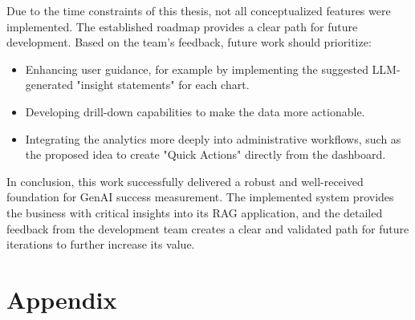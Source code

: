 \documentclass[
	english,
	ruledheaders=section,%
	class=report,%
	thesis={type=bachelor},%
	accentcolor=1b,%
	custommargins=true,%
	marginpar=false,%
	parskip=half-,%
	fontsize=11pt,%
	DIV=14,
]{tudapub}
\begin{document}
Due to the time constraints of this thesis, not all conceptualized features were implemented. The established roadmap provides a clear path for future development. Based on the team's feedback, future work should prioritize:
\begin{itemize}
    \item Enhancing user guidance, for example by implementing the suggested LLM-generated "insight statements" for each chart.
    \item Developing drill-down capabilities to make the data more actionable.
    \item Integrating the analytics more deeply into administrative workflows, such as the proposed idea to create "Quick Actions" directly from the dashboard.
\end{itemize}

In conclusion, this work successfully delivered a robust and well-received foundation for GenAI success measurement. The implemented system provides the business with critical insights into its RAG application, and the detailed feedback from the development team creates a clear and validated path for future iterations to further increase its value.
\chapter*{Appendix}
\setcounter{page}{\value{seitenzahlroemisch}}




\printbibliography



\end{document}
